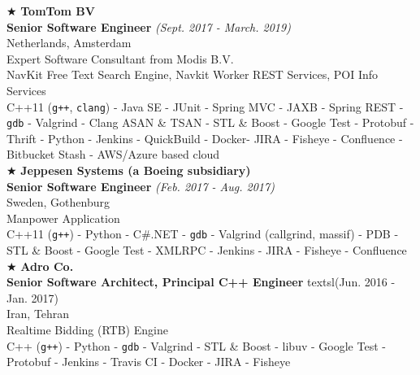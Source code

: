 \documentclass[10pt,a4paper]{article}
\begin{document}
\noindent $\bigstar$ \hspace{0.1cm} \large \textbf{TomTom BV} \\
\indent \small \textbf{Senior Software Engineer} \textsl{(Sept. 2017 - March. 2019)} \\
\indent \textnormal{Netherlands, Amsterdam} \\
\indent \textbullet \hspace{0.05cm} Expert Software Consultant from Modis B.V. \\
\indent \textbullet \hspace{0.05cm} NavKit Free Text Search Engine, Navkit Worker REST Services, POI Info Services \\
\indent \textbullet \hspace{0.05cm} C++11 (\texttt{g++}, \texttt{clang}) - Java SE - JUnit - Spring MVC - JAXB - Spring REST -  \texttt{gdb} - Valgrind - Clang ASAN \& TSAN - STL \& Boost - Google Test - Protobuf - Thrift - Python - Jenkins - QuickBuild - Docker- JIRA - Fisheye - Confluence - Bitbucket Stash - AWS/Azure based cloud \\

\noindent $\bigstar$ \hspace{0.1cm} \large \textbf{Jeppesen Systems (a Boeing subsidiary)} \\
\indent \small \textbf{Senior Software Engineer} \textsl{(Feb. 2017 - Aug. 2017)} \\
\indent \textnormal{Sweden, Gothenburg} \\
\indent \textbullet \hspace{0.05cm} Manpower Application \\
\indent \textbullet \hspace{0.05cm} C++11 (\texttt{g++}) - Python - C\#.NET - \texttt{gdb} - Valgrind (callgrind, massif) - PDB - STL \& Boost - Google Test - XMLRPC - Jenkins - JIRA - Fisheye - Confluence \\

\noindent $\bigstar$ \hspace{0.1cm} \large \textbf{Adro Co.} \\
\indent \small \textbf{Senior Software Architect, Principal C++ Engineer} textsl{(Jun. 2016 - Jan. 2017)} \\
\indent \textnormal{Iran, Tehran} \\
\indent \textbullet \hspace{0.05cm} Realtime Bidding (RTB) Engine \\
\indent \textbullet \hspace{0.05cm} C++ (\texttt{g++}) - Python - \texttt{gdb} - Valgrind - STL \& Boost - libuv - Google Test - Protobuf - Jenkins - Travis CI - Docker - JIRA - Fisheye \\
\end{document}
